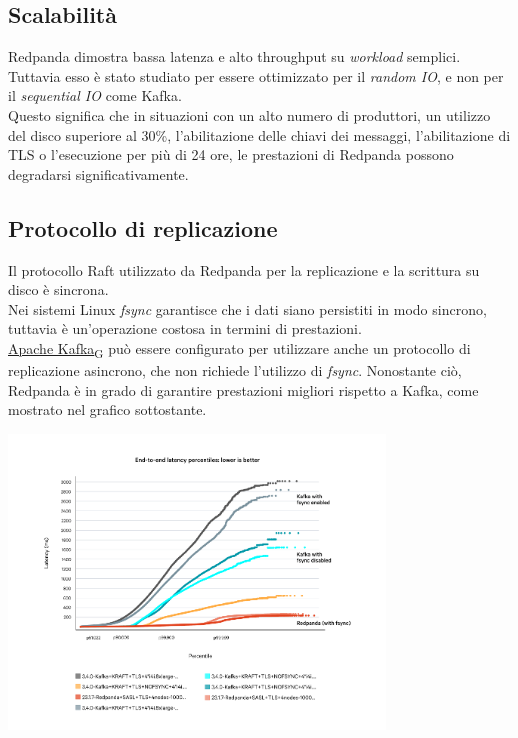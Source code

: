 \subsection{Scalabilità}
Redpanda dimostra bassa latenza e alto throughput su \textit{workload} semplici. Tuttavia esso è stato studiato per essere ottimizzato per il \textit{random IO}, e non per il \textit{sequential IO} come Kafka.\\
Questo significa che in situazioni con un alto numero di produttori, un utilizzo del disco superiore al 30\%, l'abilitazione delle chiavi dei messaggi, l'abilitazione di TLS o l'esecuzione per più di 24 ore,
le prestazioni di Redpanda possono degradarsi significativamente.\\

\subsection{Protocollo di replicazione}
Il protocollo Raft utilizzato da Redpanda per la replicazione e la scrittura su disco è sincrona. \\
Nei sistemi Linux \textit{fsync} garantisce che i dati siano persistiti in modo sincrono, tuttavia
è un'operazione costosa in termini di prestazioni.\\
\href{https://7last.github.io/docs/rtb/documentazione-interna/glossario\#apache-kafka}{Apache Kafka\textsubscript{G}} può essere configurato per utilizzare anche un protocollo di replicazione asincrono, che non richiede l'utilizzo di \textit{fsync}.
Nonostante ciò, Redpanda è in grado di garantire prestazioni migliori rispetto a Kafka, come mostrato nel grafico sottostante.

\begin{center}
	\includegraphics[width=0.75\textwidth]{imgs/fsync.png}
\end{center}




























